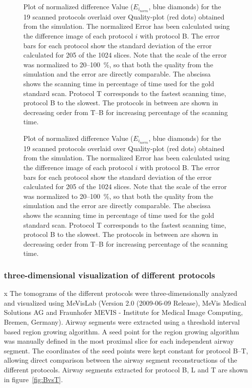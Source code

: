\ifiucr
	\begin{figure}%
		\centering%
		\caption{%
			Plot of normalized difference Value ($E_{i_{norm}}$, blue diamonds) for the 19 scanned protocols overlaid over Quality-plot (red dots) obtained from the simulation. The normalized Error has been calculated using the difference image of each protocol $i$ with protocol B. The error bars for each protocol show the standard deviation of the error calculated for 205 of the 1024 slices. Note that the scale of the error was normalized to 20--\SI{100}{\percent}, so that both the quality from the simulation and the error are directly comparable. The abscissa shows the scanning time in percentage of time used for the gold standard scan. Protocol T corresponds to the fastest scanning time, protocol B to the slowest. The protocols in between are shown in decreasing order from T--B for increasing percentage of the scanning time.%
		}%
		\label{fig:NormalizedErrorPlot}%
	\end{figure}%
\else
	\begin{figure}[htp]
		\centering
		
		\caption{%
			Plot of normalized difference Value ($E_{i_{norm}}$, blue diamonds) for the 19 scanned protocols overlaid over Quality-plot (red dots) obtained from the simulation. The normalized Error has been calculated using the difference image of each protocol $i$ with protocol B. The error bars for each protocol show the standard deviation of the error calculated for 205 of the 1024 slices. Note that the scale of the error was normalized to 20--\SI{100}{\percent}, so that both the quality from the simulation and the error are directly comparable. The abscissa shows the scanning time in percentage of time used for the gold standard scan. Protocol T corresponds to the fastest scanning time, protocol B to the slowest. The protocols in between are shown in decreasing order from T--B for increasing percentage of the scanning time.%
		}%
		\label{fig:NormalizedErrorPlot}
	\end{figure}
\fi

\subsubsection{three-dimensional visualization of different protocols}
\label{subsec:comparison}
x	The tomograms of the different protocols were three-dimensionally analyzed and visualized using MeVisLab (Version 2.0 (2009-06-09 Release), MeVis Medical Solutions AG and Fraunhofer MEVIS - Institute for Medical Image Computing, Bremen, Germany). Airway segments were extracted using a threshold interval based region growing algorithm. A seed point for the region growing algorithm was manually defined in the most proximal slice for each independent airway segment. The coordinates of the seed points were kept constant for protocol B--T, allowing direct comparison between the airway segment reconstructions of the different protocols. Airway segments extracted for protocol B, L and T are shown in figure~\ref{fig:BvsT}.

